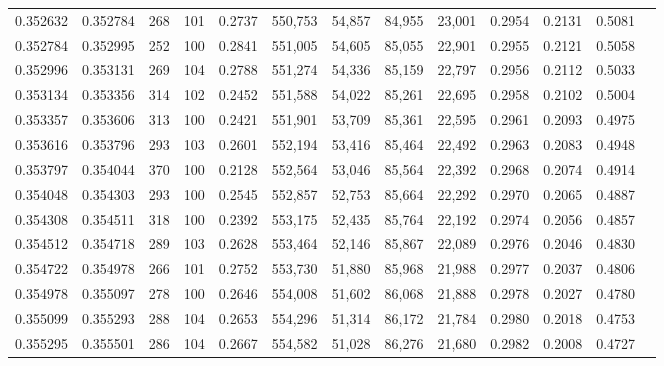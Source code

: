 \begin{tabular}{rrrrrrrrrrrrr}
0.352632 & 0.352784 &   268 & 101 &                                     0.2737 & 550,753 &  54,857 &  84,955 &  23,001 & 0.2954 & 0.2131 & 0.5081 \\
0.352784 & 0.352995 &   252 & 100 &                                     0.2841 & 551,005 &  54,605 &  85,055 &  22,901 & 0.2955 & 0.2121 & 0.5058 \\
0.352996 & 0.353131 &   269 & 104 &                                     0.2788 & 551,274 &  54,336 &  85,159 &  22,797 & 0.2956 & 0.2112 & 0.5033 \\
0.353134 & 0.353356 &   314 & 102 &                                     0.2452 & 551,588 &  54,022 &  85,261 &  22,695 & 0.2958 & 0.2102 & 0.5004 \\
0.353357 & 0.353606 &   313 & 100 &                                     0.2421 & 551,901 &  53,709 &  85,361 &  22,595 & 0.2961 & 0.2093 & 0.4975 \\
0.353616 & 0.353796 &   293 & 103 &                                     0.2601 & 552,194 &  53,416 &  85,464 &  22,492 & 0.2963 & 0.2083 & 0.4948 \\
0.353797 & 0.354044 &   370 & 100 &                                     0.2128 & 552,564 &  53,046 &  85,564 &  22,392 & 0.2968 & 0.2074 & 0.4914 \\
0.354048 & 0.354303 &   293 & 100 &                                     0.2545 & 552,857 &  52,753 &  85,664 &  22,292 & 0.2970 & 0.2065 & 0.4887 \\
0.354308 & 0.354511 &   318 & 100 &                                     0.2392 & 553,175 &  52,435 &  85,764 &  22,192 & 0.2974 & 0.2056 & 0.4857 \\
0.354512 & 0.354718 &   289 & 103 &                                     0.2628 & 553,464 &  52,146 &  85,867 &  22,089 & 0.2976 & 0.2046 & 0.4830 \\
0.354722 & 0.354978 &   266 & 101 &                                     0.2752 & 553,730 &  51,880 &  85,968 &  21,988 & 0.2977 & 0.2037 & 0.4806 \\
0.354978 & 0.355097 &   278 & 100 &                                     0.2646 & 554,008 &  51,602 &  86,068 &  21,888 & 0.2978 & 0.2027 & 0.4780 \\
0.355099 & 0.355293 &   288 & 104 &                                     0.2653 & 554,296 &  51,314 &  86,172 &  21,784 & 0.2980 & 0.2018 & 0.4753 \\
0.355295 & 0.355501 &   286 & 104 &                                     0.2667 & 554,582 &  51,028 &  86,276 &  21,680 & 0.2982 & 0.2008 & 0.4727 \\

\end{tabular}
